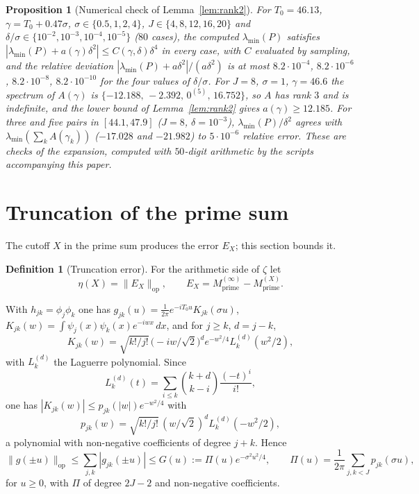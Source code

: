 \documentclass[11pt]{amsart}
\newtheorem{proposition}[theorem]{Proposition}
\theoremstyle{definition}
\newtheorem{definition}[theorem]{Definition}
\theoremstyle{remark}
\newcommand{\lmin}{\lambda_{\min}}
\begin{document}
\begin{proposition}[Numerical check of Lemma~\ref{lem:rank2}]\label{prop:numconf}
For $T_0=46.13$, $\gamma=T_0+0.47\sigma$, $\sigma\in\{0.5,1,2,4\}$,
$J\in\{4,8,12,16,20\}$ and $\delta/\sigma\in\{10^{-2},10^{-3},10^{-4},10^{-5}\}$
($80$ cases), the computed $\lmin(P)$ satisfies
$|\lmin(P)+a(\gamma)\delta^2|\le C(\gamma,\delta)\delta^4$ in every case,
with $C$ evaluated by sampling, and the relative deviation
$|\lmin(P)+a\delta^2|/(a\delta^2)$ is at most $8.2\cdot10^{-4}$, $8.2\cdot10^{-6}$,
$8.2\cdot10^{-8}$, $8.2\cdot10^{-10}$ for the four values of $\delta/\sigma$.
For $J=8$, $\sigma=1$, $\gamma=46.6$ the spectrum of $A(\gamma)$ is
$\{-12.188,\,-2.392,\,0^{(5)},\,16.752\}$, so $A$ has rank $3$ and is
indefinite, and the lower bound of Lemma~\ref{lem:rank2} gives
$a(\gamma)\ge12.185$. For three and five pairs in $[44.1,47.9]$ ($J=8$,
$\delta=10^{-3}$), $\lmin(P)/\delta^2$ agrees with
$\lmin(\sum_kA(\gamma_k))$ ($-17.028$ and $-21.982$) to $5\cdot10^{-6}$
relative error. These are checks of the expansion, computed with
$50$-digit arithmetic by the scripts accompanying this paper.
\end{proposition}

\section{Truncation of the prime sum}\label{sec:trunc}

The cutoff $X$ in the prime sum produces the error $E_X$; this section
bounds it.

\begin{definition}[Truncation error]
For the arithmetic side of $\zeta$ let
\[
\eta(X)=\|E_X\|_{\mathrm{op}},\qquad
E_X=M^{(\infty)}_{\mathrm{prime}}-M^{(X)}_{\mathrm{prime}} .
\]
\end{definition}

With $h_{jk}=\phi_j\phi_k$ one has
$g_{jk}(u)=\frac1{2\pi}e^{-iT_0u}K_{jk}(\sigma u)$,
$K_{jk}(w)=\int\psi_j(x)\psi_k(x)e^{-iwx}\,dx$, and for $j\ge k$, $d=j-k$,
\[
K_{jk}(w)=\sqrt{k!/j!}\,\bigl(-iw/\sqrt2\bigr)^{d}e^{-w^2/4}L_k^{(d)}(w^2/2),
\]
with $L_k^{(d)}$ the Laguerre polynomial. Since
\[
L_k^{(d)}(t)=\sum_{i\le k}\binom{k+d}{k-i}\frac{(-t)^i}{i!},
\]
one has
$|K_{jk}(w)|\le p_{jk}(|w|)e^{-w^2/4}$ with
\[
p_{jk}(w)=\sqrt{k!/j!}\,(w/\sqrt2)^{d}L_k^{(d)}(-w^2/2),
\]
a polynomial with
non-negative coefficients of degree $j+k$. Hence
\[
\|g(\pm u)\|_{\mathrm{op}}\le\sum_{j,k}|g_{jk}(\pm u)|\le G(u):=\Pi(u)e^{-\sigma^2u^2/4},
\qquad \Pi(u)=\frac1{2\pi}\sum_{j,k<J}p_{jk}(\sigma u),
\]
for $u\ge0$, with $\Pi$ of degree $2J-2$ and non-negative coefficients.
\end{document}
